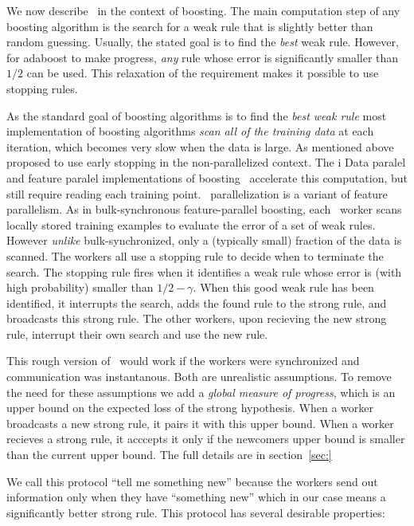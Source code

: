We now describe \tmsn\ in the context of boosting.
The main computation step of any boosting algorithm is the search for
a weak rule that is slightly better than random guessing. Usually, the
stated goal is to find the {\em best} weak rule. However, for adaboost
to make progress, {\em any} rule whose error is significantly smaller
than $1/2$ can be used. This relaxation of the requirement makes it
possible to use stopping rules.

As the standard goal of boosting algorithms is to find the {\em best
weak rule} most implementation of boosting algorithms {\em scan all
of the training data} at each iteration, which becomes very slow
when the data is large. As mentioned
above~\cite{domingo_scaling_2000,bradley_filterboost:_2007} proposed
to use early stopping in the non-parallelized context. The i
Data paralel and feature paralel
implementations of boosting~\cite{} accelerate this computation, but
still require reading each training point.  \tmsn\ parallelization is
a variant of feature parallelism. As in bulk-synchronous
feature-parallel boosting, each \tmsn\ worker scans locally stored
training examples to evaluate the error of a set of weak
rules. However {\em unlike} bulk-synchronized, only a (typically
small) fraction of the data is scanned.  The workers all use a
stopping rule to decide when to terminate the search. The stopping
rule fires when it identifies a weak rule whose error is (with high
probability) smaller than $1/2-\gamma$. When this good weak rule has
been identified, it interrupts the search, adds the found rule to the
strong rule, and broadcasts this strong rule. The other workers, upon
recieving the new strong rule, interrupt their own search and use the
new rule.

This rough version of \tmsn\ would work if the workers were
synchronized and communication was instantanous. Both are unrealistic
assumptions. To remove the need for these assumptions we add a {\em
  global measure of progress}, which is an upper bound on the expected
loss of the strong hypothesis. When a worker broadcasts a new strong
rule, it pairs it with this upper bound. When a worker recieves a
strong rule, it acccepts it only if the newcomers upper bound is
smaller than the current upper bound. The full details are in
section~\ref{sec:}

We call this protocol ``tell me something new'' because the workers
send out information only when they have ``something new'' which in
our case means a significantly better strong rule. This protocol has
several desirable properties:

